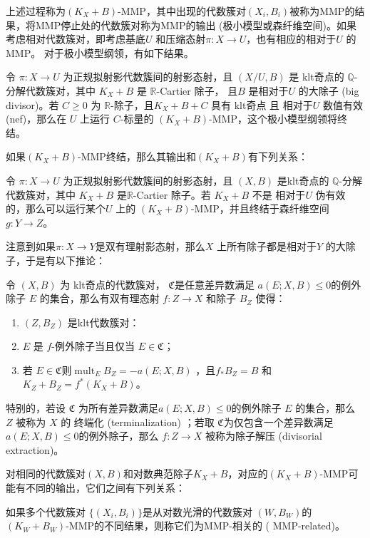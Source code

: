 上述过程称为$(K_{X}+B)$-MMP，其中出现的代数簇对$(X_{i},B_{i})$被称为MMP的结果，将MMP停止处的代数簇对称为MMP的输出 (极小模型或森纤维空间)。如果考虑相对代数簇对，即考虑基底$U$ 和压缩态射$\pi:X\to U$，也有相应的相对于$U$ 的MMP。  对于极小模型纲领，有如下结果。
\begin{theorem}
  \cite[Corollary 1.4.2]{BCHM10} 令 $ \pi: X\to U $ 为正规拟射影代数簇间的射影态射，且 $(X/U, B)$ 是 klt奇点的 $\mathbb{Q}$-分解代数簇对，其中 $K_{X}+B$ 是 $\mathbb{R}$-Cartier 除子， 且$B$ 是相对于$U$ 的大除子 (big divisor)。若 $C\geqslant0$ 为 $\mathbb{R}$-除子，且$K_{X}+B+C$ 具有 klt奇点 且 相对于$U$ 数值有效 (nef)，那么在 $U$ 上运行 $C$-标量的  $(K_{X}+B)$-MMP，这个极小模型纲领将终结。
\end{theorem}

如果$(K_{X}+B)$-MMP终结，那么其输出和$(K_{X}+B)$有下列关系：
\begin{theorem}[极小模型输出]\label{notpseudoeffmfs}
  \cite[Corollary 1.3.3]{BCHM10} 令 $ \pi: X\to U $ 为正规拟射影代数簇间的射影态射，且 $(X, B)$ 是klt奇点的 $\mathbb{Q}$-分解代数簇对，其中 $K_{X}+B$ 是$\mathbb{R}$-Cartier 除子。若 $K_{X}+B$ 不是 相对于$U$ 伪有效的，那么可以运行某个$U$ 上的  $(K_{X}+B)$-MMP，并且终结于森纤维空间$g:Y\to Z$。
\end{theorem}
注意到如果$ \pi:X \to Y$是双有理射影态射，那么$X$ 上所有除子都是相对于$Y$ 的大除子，于是有以下推论：   
\begin{corollary}\label{extraction}
  \cite[Corollary 13.7]{haconMinimalModelProgram2012} 令 $ (X,B) $ 为 klt奇点的代数簇对， $\mathfrak{C}$是任意差异数满足 $ a(E;X,B)\leqslant 0 $的例外除子 $E$ 的集合，那么有双有理态射 $ f:Z\to X $ 和除子 $ B_Z $ 使得：
  \begin{enumerate}
    \item $ (Z,B_Z) $ 是klt代数簇对：
    \item $ E $ 是 $f$-例外除子当且仅当 $ E\in \mathfrak{C} $；
    \item  若 $E \in \mathfrak{C}$则$ \operatorname{mult}_{E}B_Z=-a(E;X,B) $ ，且$ f_*B_Z=B $ 和 $ K_Z+B_Z=f^*(K_X+B) $。
  \end{enumerate}
  特别的，若设 $\mathfrak{C}$ 为所有差异数满足$a(E; X, B)\leqslant 0$的例外除子 $E$ 的集合，那么 $ Z $ 被称为 $X$ 的 终端化 (terminalization) ；若取 $\mathfrak{C}$为仅包含一个差异数满足 $a(E; X, B)\leqslant 0$的例外除子，那么 $ f: Z\to X $ 被称为除子解压 (divisorial extraction)。
\end{corollary}
对相同的代数簇对$(X,B)$和对数典范除子$K_{X}+B$，对应的$(K_{X}+B)$-MMP可能有不同的输出，它们之间有下列关系：
\begin{definition}
  \cite[Definition 3.3]{brunoLogSarkisovProgram1995}
  如果多个代数簇对 $ \{(X_i,B_i)\} $是从对数光滑的代数簇对 $(W,B_{W})$的 $(K_{W}+B_{W}) $-MMP的不同结果，则称它们为MMP-相关的 ( MMP-related)。 
\end{definition}

